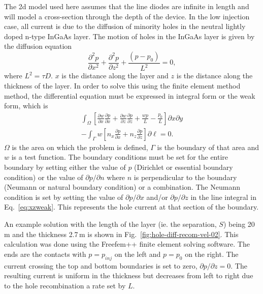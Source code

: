 The 2d model used here assumes that the line diodes are infinite in
length and will model a cross-section through the depth of the device.
In the low injection case, all current is due to the diffusion of minority
holes in the neutral lightly doped n-type InGaAs layer.
The motion of holes in the InGaAs layer is given by the diffusion equation
\begin{equation}\label{eq:xzdiff}
\frac{\partial^2p}{\partial x^2}+\frac{\partial^2p}{\partial z^2}
     + \frac{(p-p_0)}{L^2}=0,
\end{equation}
where $L^2=\tau D$.
$x$ is the distance along the layer and $z$ is the distance along the thickness
of the layer.  In order to solve this using the finite element method
method,\cite{reddy} the differential equation must be expressed in integral form
or the weak form, which is
\begin{eqnarray}\label{eq:xzweak}
\int_\Omega \left[ \frac{\partial w}{\partial x}\frac{\partial p}{\partial x}
    +  \frac{\partial w}{\partial z}\frac{\partial p}{\partial z}
    + \frac{wp}{L} - \frac{p_0}{L} \right]\partial x \partial y \nonumber \\
    -\int_\Gamma w\left[ n_x\frac{\partial p}{\partial x} + 
      n_z \frac{\partial p}{\partial z} \right]\partial \ell = 0.
\end{eqnarray}
$\Omega$ is the area on which the problem is defined, $\Gamma$ is
the boundary of that area and $w$ is a test function.
The boundary conditions must be set for the entire boundary by setting
either the value of $p$ (Dirichlet or essential boundary condition) or
the value of $\partial p / \partial n$ where $n$ is perpendicular to
the boundary (Neumann or natural boundary condition)
or a combination.
The Neumann condition is set by setting the value of $\partial p/\partial x$
and/or $\partial p/\partial z$ in the line integral in Eq.~\ref{eq:xzweak}.
This represents the hole current at that section of the boundary.

An example solution with the length of the layer
(ie. the separation, $S$) being 20\,\textmu m and
the thickness 2.7\,\textmu m is shown in Fig.~\ref{fig:hole-diff-recom-vel-02}.
This calculation was done using the Freefem++ finite element solving
 software.\cite{freefem}
The ends are the contacts with $p=p_{inj}$ on the left and $p=p_0$ on the right.
The current crossing the top and bottom boundaries is set to zero,
$\partial p/\partial z=0$.
The resulting current is uniform in the thickness but decreases from left to right
due to the hole recombination a rate set by $L$.

